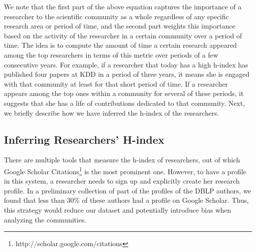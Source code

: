 \documentclass{sig-alternate-10pt}
\begin{document}
We note that the first part of the above equation captures the importance of a researcher to the scientific community as a whole regardless of any specific research area or period of time, and the second part weights this importance based on the activity of the researcher in a certain community over a period of time. The idea is to compute the amount of time a certain research appeared among the top researchers in terms of this metric over periods of a few consecutive years. For example, if a researcher that today has a high h-index has published four papers at KDD in a period of three years, it means she is engaged with that community at least for that short period of time. If a researcher appears among the top ones within a community for several of these periods, it suggests that she has a life of contributions dedicated to that community. Next, we briefly describe how we have inferred the h-index of the researchers.




\subsection{Inferring Researchers' H-index}

There are multiple tools that measure the h-index of researchers, out of which Google Scholar Citations\footnote{http://scholar.google.com/citations} is the most prominent one. However, to have a profile in this system, a researcher needs to sign up and explicitly create her research profile. In a preliminary collection of part of the profiles of the DBLP authors, we found that less than 30\% of these authors had a profile on Google Scholar. Thus, this strategy would reduce our dataset and potentially introduce bias when analyzing the communities.
\end{document}
